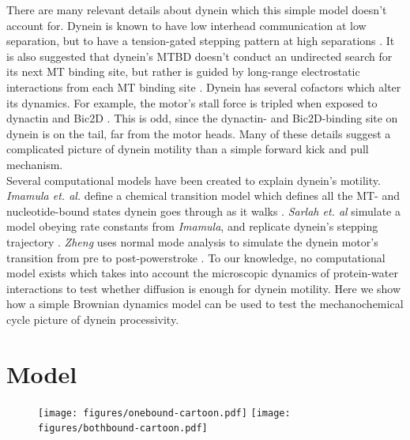 \documentclass[9pt,twocolumn,twoside]{pnas-new}
\begin{document}
There are many relevant details about dynein which this simple model doesn't account for. Dynein is known to have low interhead communication at low separation, but to have a tension-gated stepping pattern at high separations \cite{yildizpaper}. It is also suggested that dynein's MTBD doesn't conduct an undirected search for its next MT binding site, but rather is guided by long-range electrostatic interactions from each MT binding site \cite{longrangemt}. Dynein has several cofactors which alter its dynamics. For example, the motor's stall force is tripled when exposed to dynactin and Bic2D \cite{yildizdynactin}. This is odd, since the dynactin- and Bic2D-binding site on dynein is on the tail, far from the motor heads. Many of these details suggest a complicated picture of dynein motility than a simple forward kick and pull mechanism.\\

Several computational models have been created to explain dynein's motility. \textit{Imamula et. al.} define a chemical transition model which defines all the MT- and nucleotide-bound states dynein goes through as it walks \cite{imamulamodel}. \textit{Sarlah et. al} simulate a model obeying rate constants from \textit{Imamula}, and replicate dynein's stepping trajectory \cite{sarlahmodel}. \textit{Zheng} uses normal mode analysis to simulate the dynein motor's transition from pre to post-powerstroke \cite{normalmodes}. To our knowledge, no computational model exists which takes into account the microscopic dynamics of protein-water interactions to test whether diffusion is enough for dynein motility. Here we show how a simple Brownian dynamics model can be used to test the mechanochemical cycle picture of dynein processivity.\\

\section*{Model}


\begin{figure}[tbhp]
\centering
\texttt{[image: figures/onebound-cartoon.pdf]}%
\texttt{[image: figures/bothbound-cartoon.pdf]}
\caption{}
\end{figure}
\end{document}
